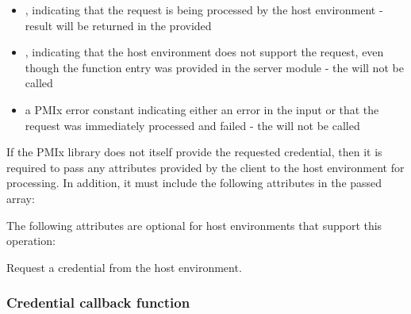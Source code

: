 \begin{arglist}
\end{arglist}

\begin{itemize}
    \item {}, indicating that the request is being processed by the host environment - result will be returned in the provided 
    \item {}, indicating that the host environment does not support the request, even though the function entry was provided in the server module - the  will not be called
    \item a PMIx error constant indicating either an error in the input or that the request was immediately processed and failed - the  will not be called
\end{itemize}

\reqattrstart
If the \ac{PMIx} library does not itself provide the requested credential, then it is required to pass any attributes provided by the client to the host environment for processing. In addition, it must include the following attributes in the passed  array:


\reqattrend

\optattrstart
The following attributes are optional for host environments that support this operation:


\optattrend

\descr

Request a credential from the host environment.


\subsubsection{Credential callback function}

